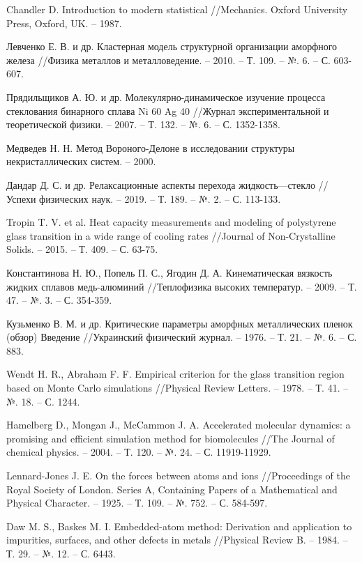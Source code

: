\documentclass[master,14pt,subf,href,colorlinks=true]{disser}
\begin{document}
\begin{thebibliography}{44}
	Chandler D. Introduction to modern statistical //Mechanics. Oxford University Press, Oxford, UK. – 1987.
	
	Левченко Е. В. и др. Кластерная модель структурной организации аморфного железа //Физика металлов и металловедение. – 2010. – Т. 109. – №. 6. – С. 603-607.
	
	Прядильщиков А. Ю. и др. Молекулярно-динамическое изучение процесса стеклования бинарного сплава Ni 60 Ag 40 //Журнал экспериментальной и теоретической физики. – 2007. – Т. 132. – №. 6. – С. 1352-1358.	
	
	Медведев Н. Н. Метод Вороного-Делоне в исследовании структуры некристаллических систем. – 2000.
	
	Дандар Д. С. и др. Релаксационные аспекты перехода жидкость—стекло //Успехи физических наук. – 2019. – Т. 189. – №. 2. – С. 113-133.
	
	Tropin T. V. et al. Heat capacity measurements and modeling of polystyrene glass transition in a wide range of cooling rates //Journal of Non-Crystalline Solids. – 2015. – Т. 409. – С. 63-75.
	
	Константинова Н. Ю., Попель П. С., Ягодин Д. А. Кинематическая вязкость жидких сплавов медь-алюминий //Теплофизика высоких температур. – 2009. – Т. 47. – №. 3. – С. 354-359.
	
	Кузьменко В. М. и др. Критические параметры аморфных металлических пленок (обзор) Введение //Украинский физический журнал. – 1976. – Т. 21. – №. 6. – С. 883.
	
	Wendt H. R., Abraham F. F. Empirical criterion for the glass transition region based on Monte Carlo simulations //Physical Review Letters. – 1978. – Т. 41. – №. 18. – С. 1244.
	
	Hamelberg D., Mongan J., McCammon J. A. Accelerated molecular dynamics: a promising and efficient simulation method for biomolecules //The Journal of chemical physics. – 2004. – Т. 120. – №. 24. – С. 11919-11929.
	
	Lennard-Jones J. E. On the forces between atoms and ions //Proceedings of the Royal Society of London. Series A, Containing Papers of a Mathematical and Physical Character. – 1925. – Т. 109. – №. 752. – С. 584-597.
	
	Daw M. S., Baskes M. I. Embedded-atom method: Derivation and application to impurities, surfaces, and other defects in metals //Physical Review B. – 1984. – Т. 29. – №. 12. – С. 6443.
	

\end{thebibliography}
\end{document}
